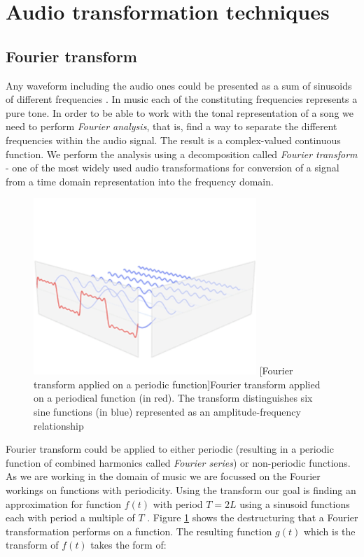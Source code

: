 \section{Audio transformation techniques}
\label{sec:audiotransform}

\subsection{Fourier transform}
\label{subsec:fourier}
Any waveform including the audio ones could be presented as a sum of sinusoids
of different frequencies \cite{fouriertransform}. In music each of the
constituting frequencies represents a pure tone. In order to be able to work
with the tonal representation of a song we need to perform \textit{Fourier
analysis}, that is, find a way to separate the different frequencies within the
audio signal. The result is a complex-valued continuous function. We perform the
analysis using a decomposition called \textit{Fourier transform} - one of the
most widely used audio transformations for conversion of a signal from a time
domain representation into the frequency domain.

\begin{figure}[H]
    \centering
    \includegraphics[width=0.75\textwidth]{BackgroundTheory/fourier-series.png}
    [Fourier transform applied on a periodic function]{Fourier transform applied on a periodical function (in red). The transform distinguishes six sine functions (in blue) represented as an amplitude-frequency relationship \cite{fourierseries}}
    \label{fig:fourierseriesimage}
\end{figure}

Fourier transform could be applied to either periodic (resulting in a periodic
function of combined harmonics called \textit{Fourier series}) or non-periodic
functions. As we are working in the domain of music we are focussed on the
Fourier workings on functions with periodicity. Using the transform our goal is
finding an approximation for function $f(t)$ with period $T=2L$ using a sinusoid
functions each with period a multiple of $T$ \cite{fourierseries}. Figure
\ref{fig:fourierseriesimage} shows the destructuring that a Fourier
transformation performs on a function. The resulting function $g(t)$ which is
the transform of $f(t)$ takes the form of:


